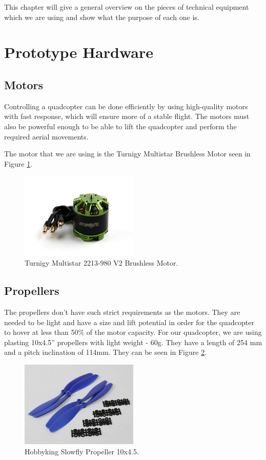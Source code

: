 This chapter will give a general overview on the pieces of technical equipment which we are using and show what the purpose of each one is.

\section{Prototype Hardware}

\subsection{Motors}\label{Motors}
Controlling a quadcopter can be done efficiently by using high-quality motors with fast response, which will ensure more of a stable flight. The motors must also be powerful enough to be able to lift the quadcopter and perform the required aerial movements. 

The motor that we are using is the Turnigy Multistar Brushless Motor seen in Figure \ref{motor}.

\begin{figure}[H]
  \centering
    \includegraphics[width=0.5\textwidth]{images/motor.jpg}
	\caption{Turnigy Multistar 2213-980 V2 Brushless Motor.\cite{motorFigC}}
	\label{motor}
\end{figure}

\subsection{Propellers}
The propellers don't have such strict requirements as the motors. They are needed to be light and have a size and lift potential in order for the quadcopter to hover at less than 50\% of the motor capacity. For our quadcopter, we are using plasting 10x4.5'' propellers with light weight - 60g. They have a length of 254 mm and a pitch inclination of 114mm.\cite{propFig} They can be seen in Figure \ref{propeller}.

\begin{figure}[H]
  \centering
    \includegraphics[width=0.5\textwidth]{images/propeller.jpg}
	\caption{Hobbyking Slowfly Propeller 10x4.5.\cite{propFig}}
	\label{propeller}
\end{figure}

